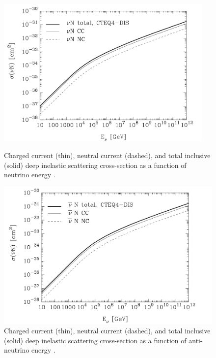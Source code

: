\documentclass{gatech-thesis}
\begin{document}
\begin{figure}[ht]
\centering
\begin{minipage}[b]{0.45\linewidth}
\includegraphics[width=0.95\textwidth]{DIS_CS_Neutrino.png}
\caption[Neutrino Deep Inelastic Scattering Cross-section]{Charged current (thin), neutral current (dashed), and total inclusive (solid) deep inelastic scattering cross-section as a function of neutrino energy \cite{Gandhi:1998ri}.}
\label{fig:NeutrinoDIS_CS}
\end{minipage}
\quad
\begin{minipage}[b]{0.45\linewidth}

\includegraphics[width=1.0\textwidth]{DIS_CS_AntiNeutrino.png}

\caption[Anti-neutrino Deep Inelastic Scattering Cross-section]{Charged current (thin), neutral current (dashed), and total inclusive (solid) deep inelastic scattering cross-section as a function of anti-neutrino energy \cite{Gandhi:1998ri}.}
\label{fig:AntiNeutrinoDIS_CS}
\end{minipage}
\end{figure}
\end{document}
